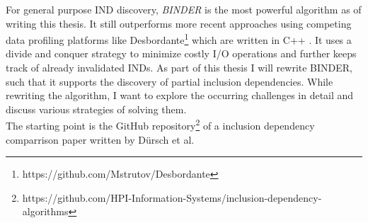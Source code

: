 For general purpose IND discovery, \textit{BINDER} \cite{papenbrock2015divide}
is the most powerful algorithm as of writing this thesis. It still outperforms more recent approaches using competing data profiling platforms like Desbordante\footnote{https://github.com/Mstrutov/Desbordante} which are written in C++ \cite{smirnov2023fast}. It uses a divide and conquer strategy to minimize costly I/O operations and further keeps track of already invalidated INDs. As part of this thesis I will rewrite BINDER, such that it supports the discovery of partial inclusion dependencies. While rewriting the algorithm, I want to explore the occurring challenges in detail and discuss various strategies of solving them. \\
The starting point is the GitHub repository\footnote{https://github.com/HPI-Information-Systems/inclusion-dependency-algorithms} of a inclusion dependency comparrison paper written by Dürsch et al. \cite{dursch2019inclusion} 